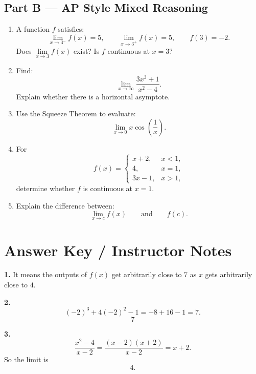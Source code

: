 \documentclass[11pt]{article}
\begin{document}
\subsection*{Part B --- AP Style Mixed Reasoning}

\begin{enumerate}[start=11]
    \item A function $f$ satisfies:
    \[
    \lim_{x\to 3^-}f(x)=5,
    \qquad
    \lim_{x\to 3^+}f(x)=5,
    \qquad
    f(3)=-2.
    \]
    Does $\lim\limits_{x\to 3}f(x)$ exist? Is $f$ continuous at $x=3$?

    \item Find:
    \[
    \lim_{x\to \infty}\frac{3x^3+1}{x^2-4}.
    \]
    Explain whether there is a horizontal asymptote.

    \item Use the Squeeze Theorem to evaluate:
    \[
    \lim_{x\to 0}x\cos\left(\frac{1}{x}\right).
    \]

    \item For
    \[
    f(x)=
    \begin{cases}
    x+2, & x<1,\\
    4, & x=1,\\
    3x-1, & x>1,
    \end{cases}
    \]
    determine whether $f$ is continuous at $x=1$.

    \item Explain the difference between:
    \[
    \lim_{x\to c}f(x)
    \qquad\text{and}\qquad
    f(c).
    \]
\end{enumerate}

\newpage

\section*{Answer Key / Instructor Notes}

\textbf{1.} It means the outputs of $f(x)$ get arbitrarily close to $7$ as $x$ gets arbitrarily close to $4$.

\bigskip

\textbf{2.}
\[
(-2)^3+4(-2)^2-1=-8+16-1=7.
\]
\[
\boxed{7}
\]

\bigskip

\textbf{3.}
\[
\frac{x^2-4}{x-2}=\frac{(x-2)(x+2)}{x-2}=x+2.
\]
So the limit is
\[
4.
\]
\end{document}
